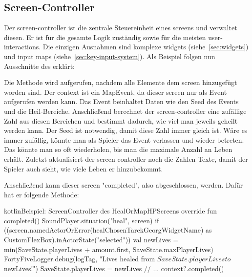\renewcommand{\kapitelautor}{Autor: Felix Zwickelstorfer}
\subsection{Screen-Controller}\label{subsec:screen-controller}
\renewcommand{\kapitelautor}{Autor: Felix Zwickelstorfer}

Der screen-controller ist die zentrale Steuereinheit eines screens und verwaltet diesen.
Er ist für die gesamte Logik zuständig sowie für die meisten user-interactions.
Die einzigen Ausnahmen sind komplexe widgets (siehe~\ref{sec:widgets}) und input maps (siehe~\ref{sec:key-input-system}).
Als Beispiel folgen nun Ausschnitte des  erklärt:



Die  Methode wird aufgerufen, nachdem alle Elemente dem screen hinzugefügt worden sind.
Der context ist ein MapEvent, da dieser screen nur als Event aufgerufen werden kann.
Das Event beinhaltet Daten wie den Seed des Events und die Heil-Bereiche.
Anschließend berechnet der screen-controller eine zufällige Zahl aus diesen Bereichen und bestimmt dadurch, wie viel man jeweils geheilt werden kann.
Der Seed ist notwendig, damit diese Zahl immer gleich ist.
Wäre es immer zufällig, könnte man als Spieler das Event verlassen und wieder betreten.
Das könnte man so oft wiederholen, bis man die maximale Anzahl an Leben erhält.
Zuletzt aktualisiert der screen-controller noch die Zahlen Texte, damit der Spieler auch sieht, wie viele Leben er hinzubekommt.

Anschließend kann dieser screen "completed", also abgeschlossen, werden.
Dafür hat er folgende Methode:
\begin{codeBlock}{kotlin}{Beispiel: Screen\-Controller des HealOrMapHP\-Screens}
    override fun completed() {
        SoundPlayer.situation("heal", screen)
        if ((screen.namedActorOrError(healChosenTarekGeorgWidgetName) as CustomFlexBox).inActorState("selected")) {
            val newLives = min(SaveState.playerLives + amount.first, SaveState.maxPlayerLives)
            FortyFiveLogger.debug(logTag, "Lives healed from ${SaveState.playerLives} to $newLives!")
            SaveState.playerLives = newLives
        }
        // ...
        context?.completed()
    }
\end{codeBlock}

